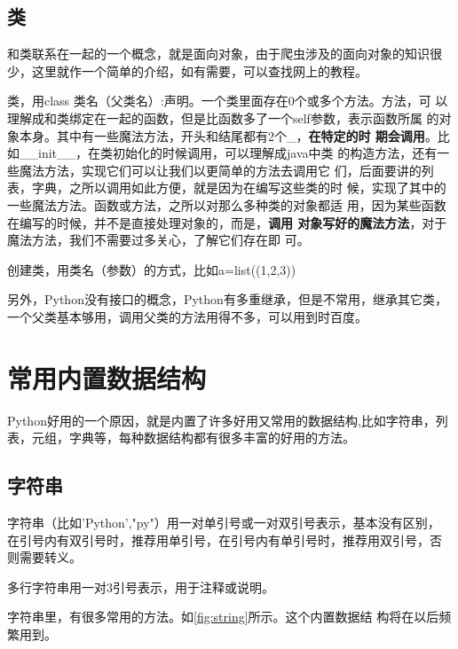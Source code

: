 \documentclass[11pt,UTF8,oneside]{mybook}
\begin{document}
\subsection{类}
\label{sec:class}

和类联系在一起的一个概念，就是面向对象，由于爬虫涉及的面向对象的知识很
少，这里就作一个简单的介绍，如有需要，可以查找网上的教程。

类，用class 类名（父类名）:声明。一个类里面存在0个或多个方法。方法，可
以理解成和类绑定在一起的函数，但是比函数多了一个self参数，表示函数所属
的对象本身。其中有一些魔法方法，开头和结尾都有2个\_，\textbf{在特定的时
  期会调用}。比如\_\_init\_\_，在类初始化的时候调用，可以理解成java中类
的构造方法，还有一些魔法方法，实现它们可以让我们以更简单的方法去调用它
们，后面要讲的列表，字典，之所以调用如此方便，就是因为在编写这些类的时
候，实现了其中的一些魔法方法。函数或方法，之所以对那么多种类的对象都适
用，因为某些函数在编写的时候，并不是直接处理对象的，而是，\textbf{调用
  对象写好的魔法方法}，对于魔法方法，我们不需要过多关心，了解它们存在即
可。

创建类，用类名（参数）的方式，比如a=list((1,2,3))

另外，Python没有接口的概念，Python有多重继承，但是不常用，继承其它类，
一个父类基本够用，调用父类的方法用得不多，可以用到时百度。

\section{常用内置数据结构}
\label{sec:data_structrue}
Python好用的一个原因，就是内置了许多好用又常用的数据结构,比如字符串，列
表，元组，字典等，每种数据结构都有很多丰富的好用的方法。

\subsection{字符串}
\label{sec:string}

字符串（比如'Python',"py"）用一对单引号或一对双引号表示，基本没有区别，
在引号内有双引号时，推荐用单引号，在引号内有单引号时，推荐用双引号，否
则需要转义。

多行字符串用一对3引号表示，用于注释或说明。

字符串里，有很多常用的方法。如\autoref{fig:string}所示。这个内置数据结
构将在以后频繁用到。
\end{document}
